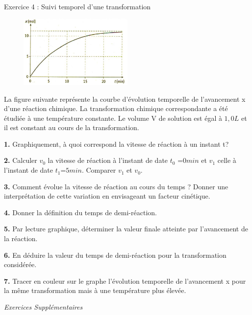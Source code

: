 \documentclass[12pt, french]{article}
\begin{document}
\begin{Box2}{Exercice 4 : Suivi temporel d’une transformation}
	\begin{figure}
  \begin{center}
	  \vspace{-0.6cm}
	\includegraphics[width=0.5\textwidth]{./img/ex4.png}
  \end{center}
\end{figure}

	La figure suivante représente la courbe
d'évolution temporelle de l'avancement x
d'une réaction chimique. La transformation
chimique correspondante a été étudiée à une
température constante. Le volume V de
solution est égal à $1,0 L$ et il est constant au
cours de la transformation.

\textbf{1. }Graphiquement, à quoi correspond la vitesse de réaction à un instant t?

\textbf{2. }Calculer $v_0$ la vitesse de réaction à l’instant de date $t_0$ =$0 min$ et $v_1$ celle à l’instant de
date $t_1$=$5min$. Comparer $v_1$ et $v_0$.

\textbf{3. }Comment évolue la vitesse de réaction au cours du temps ? Donner une interprétation de cette variation en envisageant un facteur cinétique.

\textbf{4. }Donner la définition du temps de demi-réaction.

\textbf{5. }Par lecture graphique, déterminer la valeur finale atteinte par l'avancement de la réaction.

\textbf{6. }En déduire la valeur du temps de demi-réaction pour la transformation considérée.

\textbf{7. }Tracer en couleur sur le graphe l’évolution temporelle de l'avancement x pour la même transformation mais
à une température plus élevée.


\end{Box2}
\vspace{-0.8cm}
\begin{center}
   \Large{ \em{Exercices Supplémentaires}}
\end{center}
\end{document}
